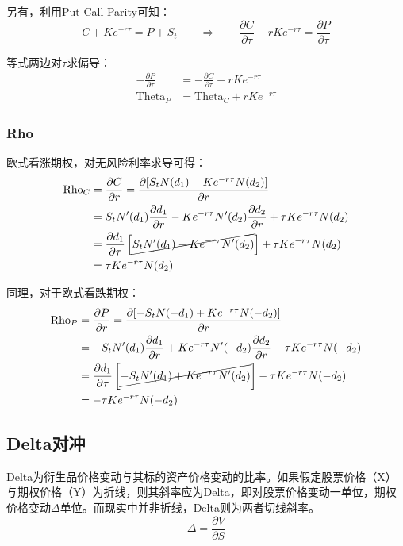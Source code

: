 \documentclass[11pt]{article}
\begin{document}
另有，利用Put-Call Parity可知：
\begin{equation*}
    C + Ke^{-r\tau} = P + S_t \qquad \Rightarrow \qquad \frac{\partial C}{\partial \tau} - rKe^{-r\tau} = \frac{\partial P}{\partial \tau} 
\end{equation*}

等式两边对$\tau$求偏导：
\begin{align*}
    -\frac{\partial P}{\partial \tau} & = -\frac{\partial C}{\partial \tau} + rKe^{-r\tau} \\
    \text{Theta}_P &= \text{Theta}_C + rKe^{-r\tau}
\end{align*}

\subsubsection{Rho}

欧式看涨期权，对无风险利率求导可得：
\begin{align*}
    \text{Rho}_C &= \frac{\partial C}{\partial r} = 
    \frac{\partial [S_t N(d_1) - Ke^{-r\tau} N(d_2)]}{\partial r} \\
    &= S_t N'(d_1) \frac{\partial d_1}{\partial r} - Ke^{-r\tau} N'(d_2)\frac{\partial d_2}{\partial r} + \tau K e^{-r\tau} N(d_2) \\
    &= \frac{\partial d_1}{\partial \tau} \left[\cancel{S_t N'(d_1) - Ke^{-r\tau} N'(d_2) } \right] + \tau K e^{-r\tau} N(d_2) \\
    &= \tau K e^{-r\tau} N(d_2)
\end{align*}

同理，对于欧式看跌期权：
\begin{align*}
    \text{Rho}_P &= \frac{\partial P}{\partial r} = 
    \frac{\partial [-S_t N(-d_1) + Ke^{-r\tau} N(-d_2)]}{\partial r} \\
    &= -S_t N'(d_1) \frac{\partial d_1}{\partial r} + Ke^{-r\tau} N'(-d_2)\frac{\partial d_2}{\partial r} - \tau Ke^{-r\tau} N(-d_2) \\
    &= \frac{\partial d_1}{\partial \tau} \left[\cancel{-S_t N'(d_1) + Ke^{-r\tau} N'(d_2) } \right] - \tau K e^{-r\tau} N(-d_2) \\
    &= -\tau K e^{-r\tau} N(-d_2)
\end{align*}

\subsection{Delta对冲}
Delta为衍生品价格变动与其标的资产价格变动的比率。如果假定股票价格（X）与期权价格（Y）为折线，则其斜率应为Delta，即对股票价格变动一单位，期权价格变动$\Delta$单位。而现实中并非折线，Delta则为两者切线斜率。
\begin{equation*}
    \Delta = \frac{\partial V}{\partial S}
\end{equation*}
\end{document}
